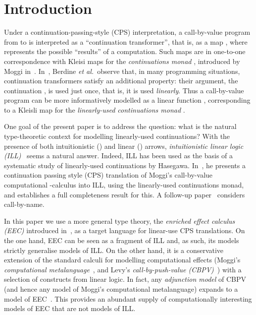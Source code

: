 \documentclass{LMCS}
\begin{document}
\maketitle

\section{Introduction}


Under a continuation-passing-style (CPS) interpretation, 
a call-by-value program
from  to  is interpreted as a ``continuation transformer'',
that is, as a map ,  where  represents the 
possible ``results'' of a computation.
Such maps are in one-to-one correspondence with Kleisi maps
for the \emph{continuations monad} , introduced by 
Moggi in~\cite{Moggi:89,Moggi:91}. 
In~\cite{BORT:02}, Berdine \emph{et al.}\ observe that,
in many programming situations, continuation transformers satisfy an
additional property: 
their argument, the continuation , is used just once,
that is, it is used \emph{linearly}.
Thus a call-by-value program can be more informatively modelled as a
linear function , corresponding to a
Kleisli map for the \emph{linearly-used continuations monad} 
.  

One goal of the present paper is to address the question: 
what is the natural type-theoretic context for
modelling linearly-used continuations? 
With the presence of both intuitionistic () and linear ()
arrows, \emph{intuitionistic linear logic (ILL)}~\cite{Girard:87}
seems a natural answer.
Indeed, ILL has been used as the basis of a systematic study of 
linearly-used continuations by Hasegawa. 
In~\cite{Hasegawa:Flops:02}, he presents a
continuation passing style (CPS) translation of 
Moggi's call-by-value computational -calculus into
ILL, using the linearly-used continuations monad, and establishes
a full completeness result for this. 
A follow-up paper~\cite{Hasegawa:Flops:04} considers call-by-name.

In this paper we use a more general type theory, the \emph{enriched
  effect calculus (EEC)} introduced in~\cite{EMS,EMSb}, as a target
language for linear-use CPS translations.  On the one hand, EEC can be
seen as a fragment of ILL and, as such, its models strictly generalise
models of ILL.
On the other hand, it is a conservative extension of the standard
calculi for modelling computational effects (Moggi's
\emph{computational metalanguage}~\cite{Moggi:91}, 
and Levy's \emph{call-by-push-value (CBPV)}~\cite{Levy:book}) with a
selection of constructs from linear logic. 
In fact, any \emph{adjunction model} of CBPV~\cite{Levy:models}
(and hence any model of Moggi's computational metalanguage)
expands to a model of EEC~\cite{EMS,EMSc}. This provides an abundant supply of 
computationally interesting models of EEC
that are not models of ILL.
\end{document}

